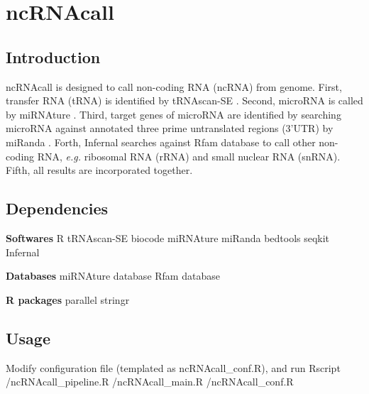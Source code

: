 \documentclass[11pt]{article}
\begin{document}
\begin{sloppypar}
\section{ncRNAcall}
\subsection{Introduction}
ncRNAcall is designed to call non-coding RNA (ncRNA) from genome. 
First, transfer RNA (tRNA) is identified by tRNAscan-SE \parencite{lowe1997trnascan}. 
Second, microRNA is called by miRNAture \parencite{velandia2021mirnature}. 
Third, target genes of microRNA are identified by searching microRNA against annotated three prime untranslated regions (3'UTR) by miRanda \parencite{enright2003microrna}. 
Forth, Infernal \parencite{nawrocki2013infernal} searches against Rfam \parencite{kalvari2021rfam} database to call other non-coding RNA, \textit{e.g.} ribosomal RNA (rRNA) and small nuclear RNA (snRNA). 
Fifth, all results are incorporated together. 
\subsection{Dependencies}
\textbf{Softwares} \newline
R \newline
tRNAscan-SE \newline
biocode \newline
miRNAture \newline
miRanda \newline
bedtools \newline
seqkit \newline
Infernal \newline
\par
\textbf{Databases} \newline
miRNAture database \newline
Rfam database \newline
\par
\textbf{R packages}
parallel \newline
stringr \newline
\par
\subsection{Usage}
Modify configuration file (templated as ncRNAcall\_conf.R), and run \newline
Rscript /ncRNAcall\_pipeline.R /ncRNAcall\_main.R /ncRNAcall\_conf.R


\end{sloppypar}
\end{document}
